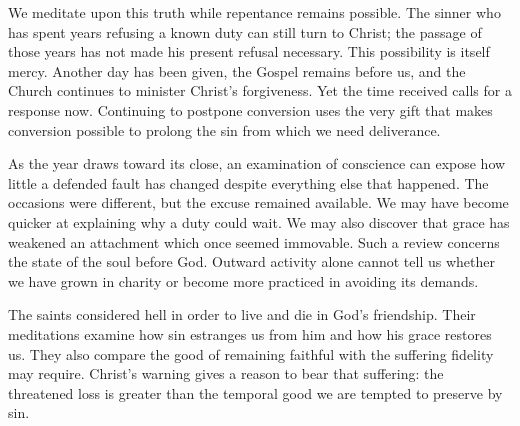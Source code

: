 We meditate upon this truth while repentance remains possible. The sinner who has spent years refusing a known duty can still turn to Christ; the passage of those years has not made his present refusal necessary. This possibility is itself mercy. Another day has been given, the Gospel remains before us, and the Church continues to minister Christ's forgiveness. Yet the time received calls for a response now. Continuing to postpone conversion uses the very gift that makes conversion possible to prolong the sin from which we need deliverance.

As the year draws toward its close, an examination of conscience can expose how little a defended fault has changed despite everything else that happened. The occasions were different, but the excuse remained available. We may have become quicker at explaining why a duty could wait. We may also discover that grace has weakened an attachment which once seemed immovable. Such a review concerns the state of the soul before God. Outward activity alone cannot tell us whether we have grown in charity or become more practiced in avoiding its demands.

The saints considered hell in order to live and die in God's friendship. Their meditations examine how sin estranges us from him and how his grace restores us. They also compare the good of remaining faithful with the suffering fidelity may require. Christ's warning gives a reason to bear that suffering: the threatened loss is greater than the temporal good we are tempted to preserve by sin.

